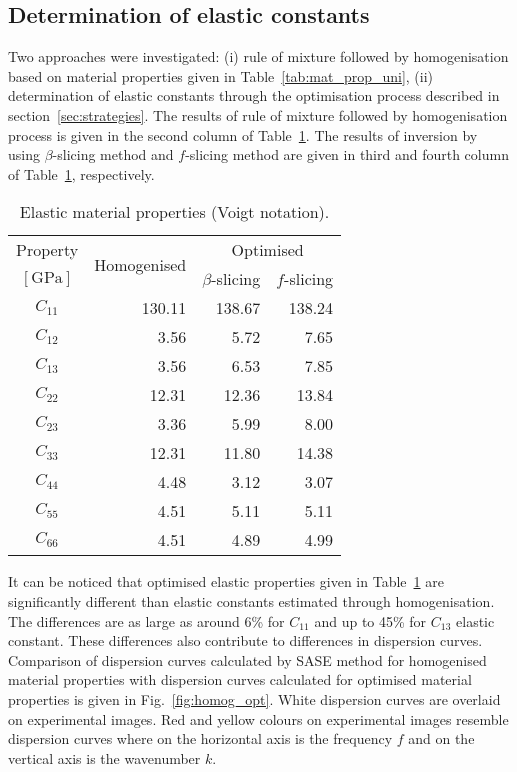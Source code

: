 \documentclass[preprint,12pt]{elsarticle}
\begin{document}
\subsection{Determination of elastic constants}
Two approaches were investigated: (i) rule of mixture followed by homogenisation based on material properties given in Table~\ref{tab:mat_prop_uni}, (ii) determination of elastic constants through the optimisation process described in section~\ref{sec:strategies}. 
The results of rule of mixture followed by homogenisation process is given in the second column of Table~\ref{tab:mat_prop_identified}.
The results of inversion by using $\beta$-slicing method and $f$-slicing method are given in third and fourth column of Table~\ref{tab:mat_prop_identified}, respectively.
\begin{table}[h]
	\renewcommand{\arraystretch}{1.3}
	\centering \footnotesize
	\caption{Elastic material properties (Voigt notation).}
	\begin{tabular}{crrr} 
		\toprule
		Property & \multirow{2}{*}{Homogenised} & \multicolumn{2}{c}{Optimised}\\
		\cmidrule(lr){3-4}
		$\left[\textrm{GPa}\right]$ &  & $\beta$-slicing & $f$-slicing \\ 
		\midrule 
		$C_{11}$ & 130.11 & 138.67 & 138.24 \\ 
		$C_{12}$ & 3.56   & 5.72   & 7.65\\ 
		$C_{13}$ & 3.56   & 6.53   & 7.85\\
		$C_{22}$ & 12.31  & 12.36  & 13.84\\
		$C_{23}$ & 3.36   & 5.99  & 8.00\\
		$C_{33}$ & 12.31  & 11.80 & 14.38\\
		$C_{44}$ & 4.48   & 3.12  & 3.07\\
		$C_{55}$ & 4.51   & 5.11  & 5.11\\
		$C_{66}$ & 4.51   & 4.89  & 4.99 \\
		\bottomrule
	\end{tabular} 
	\label{tab:mat_prop_identified}
\end{table}
It can be noticed that optimised elastic properties given in Table~\ref{tab:mat_prop_identified} are significantly different than elastic constants estimated through homogenisation. 
The differences are as large as around 6\% for $C_{11}$ and up to 45\% for $C_{13}$ elastic constant.
These differences also contribute to differences in dispersion curves. 
Comparison of dispersion curves calculated by SASE method for homogenised material properties with dispersion curves calculated for optimised material properties is given in Fig.~\ref{fig:homog_opt}. 
White dispersion curves are overlaid on experimental images. 
Red and yellow colours on experimental images resemble dispersion curves where on the horizontal axis is the frequency $f$ and on the vertical axis is the wavenumber $k$. 
\end{document}
